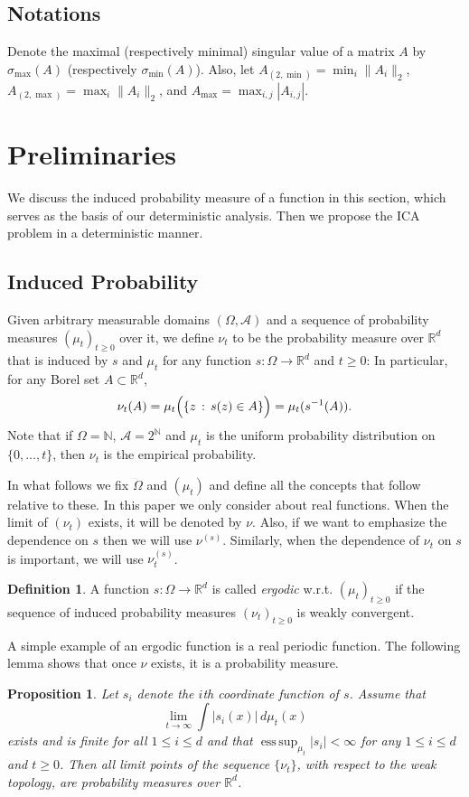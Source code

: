 \documentclass[twoside]{article}
\newcommand{\scom}[1]{s_{#1}}
\newcommand{\cset}[2]{\left\{#1\,:\,#2\right\}}
\newcommand{\ra}{\rightarrow}
\newcommand{\real}{\mathbb{R}}
\DeclareMathOperator{\esssup}{ess\,sup}
\renewcommand{\natural}{\mathbb{N}}
\newtheorem{prop}[lemma]{Proposition}
\theoremstyle{definition}
\newtheorem{definition}[lemma]{Definition}
\renewcommand{\AA}{\mathcal{A}}
\begin{document}
\subsection{Notations}
Denote the maximal (respectively minimal) singular value of a matrix $A$ by  $\sigma_{\max}(A)$ (respectively $\sigma_{\min}(A)$). Also, let $A_{(2,\min)} = \min_{i} \|A_i\|_2$, $A_{(2,\max)} = \max_{i} \|A_i\|_2$, and $A_{\max} = \max_{i,j} |A_{i,j}|$.

\section{Preliminaries}
\label{sec:Preliminaries}
We discuss the induced probability measure of a function in this section, which serves as the basis of our deterministic analysis. 
Then we propose the ICA problem in a deterministic manner. 
\subsection{Induced Probability}
\label{subsec:InducesProb}
Given arbitrary measurable domains $(\Omega,\AA)$ and a sequence of probability measures $(\mu_t)_{t\ge0}$ over it, we define $\nu_t$ to be the probability measure over $\real^d$ that is induced by $s$ and $\mu_t$ for any function $s: \Omega \ra \real^d$ and $t\ge 0$:
In particular, for any Borel set $A\subset \real^d$,
\[
\nu_t(A)= \mu_t\Bigl( \cset{z}{s(z)\in A} \Bigr)
= \mu_t ( s^{-1}(A) ).
\]
Note that if $\Omega = \natural$, $\AA = 2^\natural$ and $\mu_t$ is the uniform probability distribution on $\{0,\ldots,t\}$, then $\nu_t$ is the empirical probability.

In what follows we fix $\Omega$ and $(\mu_t)$ and define all the concepts that follow relative to these. 
In this paper we only consider about real functions.
When the limit of $(\nu_t)$ exists, it will be denoted by $\nu$.
Also, if we want to emphasize the dependence on $s$ then we will use $\nu^{(s)}$.
Similarly, when the dependence of $\nu_t$ on $s$ is important, we will use $\nu^{(s)}_t$.
\begin{definition}
A function $s:\Omega \rightarrow \real^d$ is called \emph{ergodic} w.r.t. $(\mu_t)_{t\ge0}$
if the sequence of  induced probability measures $(\nu_t)_{t\ge 0}$ is weakly convergent.
\end{definition}
A simple example of an ergodic function is a real periodic function.
The following lemma shows that once $\nu$ exists, it is a probability measure. 
\begin{prop}
\label{prop:ergodicfunction}
Let $\scom{i}$ denote the $i$th coordinate function of $s$. Assume that
\[
\lim_{t\to\infty} \int |\scom{i}(x)|\, d\mu_t(x) 
\]
exists and is finite for all $1 \le i \le d$ and that $\esssup_{\mu_t} |\scom{i}|<\infty$ for any $1\le i \le d$ and $t\ge 0$.
Then all limit points of the sequence $\{\nu_t\}$, with respect to the weak topology, are probability measures over $\real^d$.
\end{prop}
\end{document}
